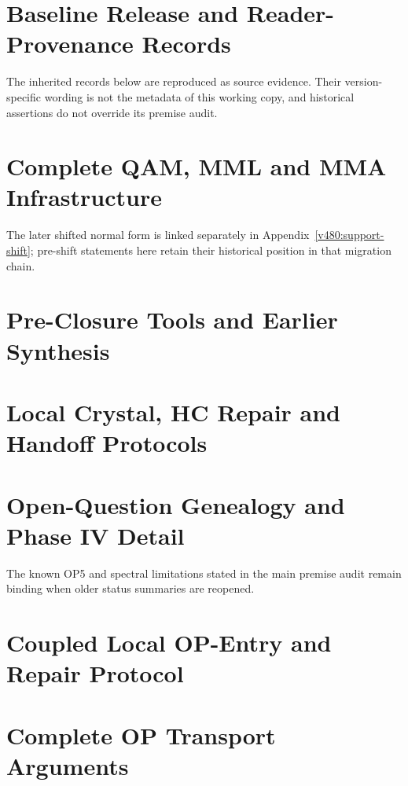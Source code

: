 \section{Baseline Release and Reader-Provenance Records}
\label{v480:support-provenance}
The inherited records below are reproduced as source evidence.
Their version-specific wording is not the metadata of this working
copy, and historical assertions do not override its premise audit.




\section{Complete QAM, MML and MMA Infrastructure}
\label{v480:support-qam}
The later shifted normal form is linked separately in
Appendix~\ref{v480:support-shift}; pre-shift statements here retain
their historical position in that migration chain.


\section{Pre-Closure Tools and Earlier Synthesis}
\label{v480:support-legacy}



\section{Local Crystal, HC Repair and Handoff Protocols}
\label{v480:support-hc}


\section{Open-Question Genealogy and Phase IV Detail}
\label{v480:support-status}
The known OP5 and spectral limitations stated in the main premise
audit remain binding when older status summaries are reopened.


\section{Coupled Local OP-Entry and Repair Protocol}
\label{v480:support-entry}


\section{Complete OP Transport Arguments}
\label{v480:support-transport}


